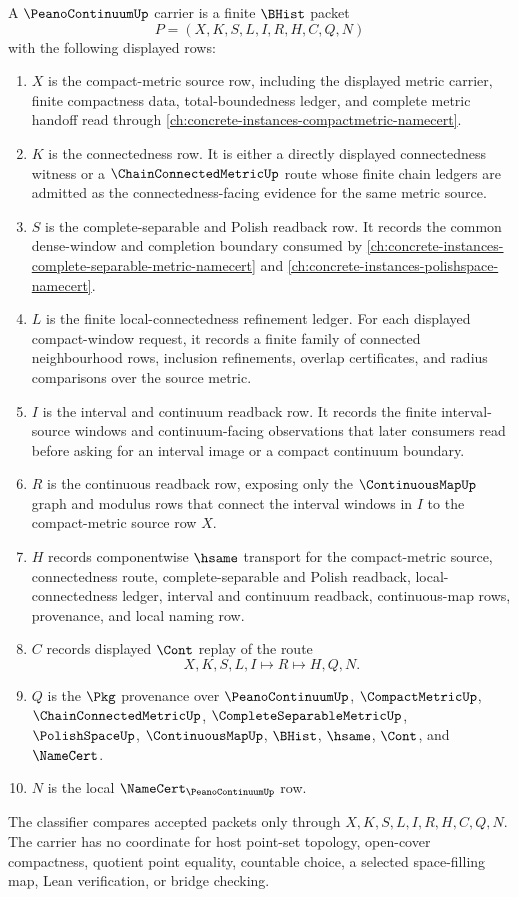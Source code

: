 \begin{definition}
\label{def:peano-continuum-carrier}
A $\PeanoContinuumUp$ carrier is a finite $\BHist$ packet
$$
P=(X,K,S,L,I,R,H,C,Q,N)
$$
with the following displayed rows:
\begin{enumerate}
\item $X$ is the compact-metric source row, including the displayed metric carrier, finite compactness data, total-boundedness ledger, and complete metric handoff read through \autoref{ch:concrete-instances-compactmetric-namecert}.
\item $K$ is the connectedness row. It is either a directly displayed connectedness witness or a $\ChainConnectedMetricUp$ route whose finite chain ledgers are admitted as the connectedness-facing evidence for the same metric source.
\item $S$ is the complete-separable and Polish readback row. It records the common dense-window and completion boundary consumed by \autoref{ch:concrete-instances-complete-separable-metric-namecert} and \autoref{ch:concrete-instances-polishspace-namecert}.
\item $L$ is the finite local-connectedness refinement ledger. For each displayed compact-window request, it records a finite family of connected neighbourhood rows, inclusion refinements, overlap certificates, and radius comparisons over the source metric.
\item $I$ is the interval and continuum readback row. It records the finite interval-source windows and continuum-facing observations that later consumers read before asking for an interval image or a compact continuum boundary.
\item $R$ is the continuous readback row, exposing only the $\ContinuousMapUp$ graph and modulus rows that connect the interval windows in $I$ to the compact-metric source row $X$.
\item $H$ records componentwise $\hsame$ transport for the compact-metric source, connectedness route, complete-separable and Polish readback, local-connectedness ledger, interval and continuum readback, continuous-map rows, provenance, and local naming row.
\item $C$ records displayed $\Cont$ replay of the route
$$
X,K,S,L,I \longmapsto R \longmapsto H,Q,N .
$$
\item $Q$ is the $\Pkg$ provenance over $\PeanoContinuumUp$, $\CompactMetricUp$, $\ChainConnectedMetricUp$, $\CompleteSeparableMetricUp$, $\PolishSpaceUp$, $\ContinuousMapUp$, $\BHist$, $\hsame$, $\Cont$, and $\NameCert$.
\item $N$ is the local $\NameCert_{\PeanoContinuumUp}$ row.
\end{enumerate}
The classifier compares accepted packets only through $X,K,S,L,I,R,H,C,Q,N$. The carrier has no coordinate for host point-set topology, open-cover compactness, quotient point equality, countable choice, a selected space-filling map, Lean verification, or bridge checking.
\end{definition}

